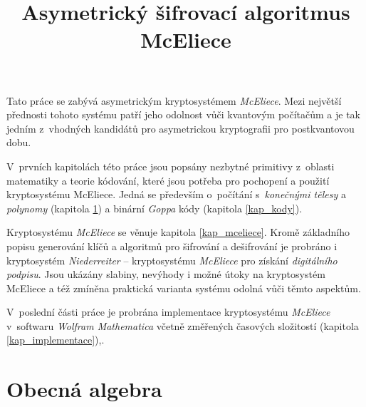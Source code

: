 \documentclass[thesis=M,czech,hidelinks]{FITthesis}[2012/06/26]
\title{Asymetrický šifrovací algoritmus McEliece}
\newcommand{\0}{{\textcolor[gray]{0.80}{0}}}
\begin{document}

\begin{introduction}

Tato práce se zabývá asymetrickým kryptosystémem \emph{McEliece}. Mezi největší
přednosti tohoto systému patří jeho odolnost vůči kvantovým počítačům a je tak
jedním z~vhodných kandidátů pro asymetrickou kryptografii pro postkvantovou
dobu.

V~prvních kapitolách této práce jsou popsány nezbytné primitivy z~oblasti
matematiky a teorie kódování, které jsou potřeba pro pochopení a použití
kryptosystému McEliece. Jedná se především o~počítání s~\emph{konečnými tělesy}
a \emph{polynomy} (kapitola \ref{kap_telesa}) a binární \emph{Goppa} kódy
(kapitola \ref{kap_kody}).

Kryptosystému \emph{McEliece} se věnuje kapitola \ref{kap_mceliece}. Kromě
základního popisu generování klíčů a algoritmů pro šifrování a dešifrování je
probráno i kryptosystém \emph{Niederreiter} --  kryptosystému
\emph{McEliece} pro získání \emph{digitálního podpisu}. Jsou ukázány slabiny,
nevýhody i možné útoky na kryptosystém McEliece a též zmíněna praktická varianta
systému odolná vůči těmto aspektům.

V~poslední části  práce je probrána implementace kryptosystému \emph{McEliece}
v~softwaru \emph{Wolfram Mathematica} včetně změřených časových
složitostí (kapitola \ref{kap_implementace}),.

\end{introduction}


\chapter{Obecná algebra}\label{kap_telesa}
\end{document}
